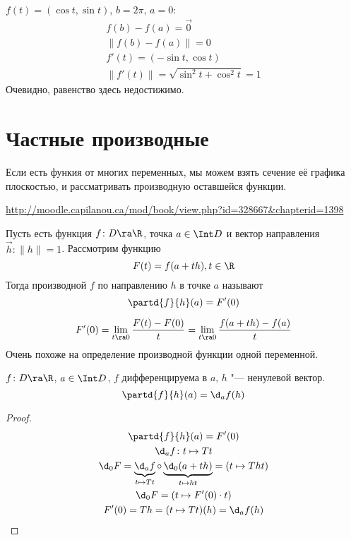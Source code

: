 \begin{exmp}
	$f(t) = (\cos t, \sin t)$, $b = 2\pi$, $a = 0$:
	\begin{gather*}
		f(b) - f(a) = \vec 0 \\
		\| f(b) - f(a) \| = 0 \\
		f'(t) = (-\sin t, \cos t) \\
		\| f'(t) \| = \sqrt{\sin^2 t + \cos^2 t} = 1
	\end{gather*}
	Очевидно, равенство здесь недостижимо.
\end{exmp}

\section{Частные производные}

Если есть функия от многих переменных, мы можем взять сечение её графика плоскостью, и рассматривать производную оставшейся функции.

\begin{center}
\small\url{http://moodle.capilanou.ca/mod/book/view.php?id=328667\&chapterid=1398}
\end{center}

\begin{Def}
	Пусть есть функция $f\colon D \ra \R$, точка $a \in \Int D$ и вектор направления $\vec h\colon \|h\| = 1$.
	Рассмотрим функцию
	\[ F(t) = f(a + th), t \in \R \]
	Тогда производной $f$ по направлению $h$ в точке $a$ называют
	\[ \partd{f}{h}(a) = F'(0) \]
\end{Def}

\begin{Rem}
	\[ F'(0) = \lim_{t \ra 0} \frac{F(t) - F(0)}t = \lim_{t \ra 0} \frac{f(a + th) - f(a)}t \]
	Очень похоже на определение производной функции одной переменной.
\end{Rem}

\begin{assertion}
	$f\colon D \ra \R$, $a \in \Int D$, $f$ дифференцируема в $a$, $h$ "--- ненулевой вектор.
	\[ \partd{f}{h}(a) = \d_a f(h) \]
\end{assertion}
\begin{proof}
	\begin{gather*}
		\partd{f}{h}(a) = F'(0) \\
		\d_a f\colon t \mapsto Tt \\
		\d_0 F = \underbrace{\d_a f}_{t \mapsto Tt} \circ \underbrace{\d_0 (a + th)}_{t \mapsto ht} = (t \mapsto Tht) \\
		\d_0 F = (t \mapsto F'(0) \cdot t) \\
		F'(0) = Th = (t \mapsto Tt)(h) = \d_a f(h)
	\end{gather*}
\end{proof}

